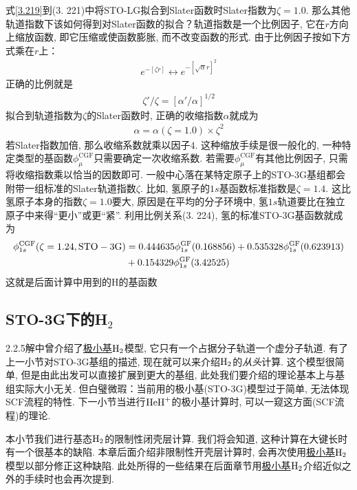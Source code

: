 式\eqref{3.219}到(3.
221)中将STO-LG拟合到Slater函数时Slater指数为$\zeta=1.0$. 
那么其他轨道指数下该如何得到对Slater函数的拟合？轨道指数是一个比例因子, 
它在$r$方向上缩放函数, 
即它压缩或使函数膨胀, 
而不改变函数的形式. 
由于比例因子按如下方式乘在$r$上：
\begin{align}
	e^{-[\zeta r]} \leftrightarrow e^{-[\sqrt{\alpha}r]^2}
\end{align}
正确的比例就是
\begin{align}
	\zeta'/\zeta=[\alpha'/\alpha]^{1/2}
\end{align}
拟合到轨道指数为$\zeta$的Slater函数时, 
正确的收缩指数$\alpha$就成为
\begin{align}
	\alpha = \alpha(\zeta=1.0)\times \zeta^2
\end{align}
若Slater指数加倍, 
那么收缩系数就乘以因子$4$. 
这种缩放手续是很一般化的, 
一种特定类型的基函数$\phi_\mu^\mathrm{CGF}$只需要确定一次收缩系数. 
若需要$\phi_\mu^\mathrm{CGF}$有其他比例因子, 
只需将收缩指数乘以恰当的因数即可. 
一般中心落在某特定原子上的STO-3G基组都会附带一组标准的Slater轨道指数$\zeta$. 
比如, 
氢原子的$1s$基函数标准指数是$\zeta=1.4$. 
这比氢原子本身的指数$\zeta=1.0$要大, 
原因是在平均的分子环境中, 
氢$1s$轨道要比在独立原子中来得``更小”或更``紧”. 
利用比例关系(3.
224), 
氢的标准STO-3G基函数就成为
\begin{align}
	\label{3.225}
	\phi_{1s}^\mathrm{CGF}(\zeta=1.24,\mathrm{STO-3G}) & = 0.444635\phi_{1s}^\mathrm{GF}(0.168856) + 0.535328\phi_{1s}^\mathrm{GF}(0.623913) \notag\\
	& + 0.154329\phi_{1s}^\mathrm{GF}(3.42525)
\end{align}
这就是后面计算中用到的$\mathrm{H}$的基函数
\subsection{STO-3G下的H$_2$}
2.2.5解中曾介绍了\underline{极小基$\mathrm{H}_2$}模型, 它只有一个占据分子轨道一个虚分子轨道. 
有了上一小节对STO-3G基组的描述, 现在就可以来介绍$\mathrm{H}_2$的\emph{从头}\hft 计算. 
这个模型很简单, 但是由此出发可以直接扩展到更大的基组, 此处我们要介绍的\hft 理论基本上与基组实际大小无关. 
但白璧微瑕：当前用的极小基(STO-3G)模型过于简单, 无法体现SCF流程的特性. 
下一小节当进行$\mathrm{HeH}^+$的极小基计算时, 可以一窥这方面(SCF流程)的\hft 理论.

本小节我们进行基态$\mathrm{H}_2$的限制性闭壳层计算. 
我们将会知道, 
这种计算在大键长时有一个很基本的缺陷. 
本章后面介绍非限制性开壳层计算时, 
会再次使用\underline{极小基$\mathrm{H}_2$}模型以部分修正这种缺陷. 
此处所得的一些结果在后面章节用\underline{极小基$\mathrm{H}_2$}介绍\hft 近似之外的手续时也会再次提到.


